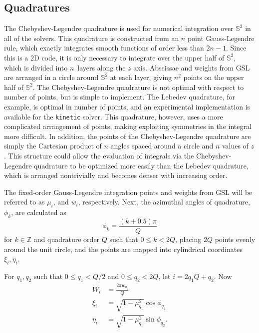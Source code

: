 \documentclass{article}
\newcommand{\Z}{\ensuremath{\mathbb{Z}}\xspace}
\newcommand{\twosphere}{\ensuremath{\mathbb{S}^2}\xspace}
\newcommand{\kinetic}{\texttt{kinetic}\xspace}
\begin{document}
\subsection{Quadratures}
\label{subsec:quadratures}
The Chebyshev-Legendre quadrature \cite{atkinson-1982} is used for numerical integration over
\twosphere in all of the solvers. This quadrature is constructed from an
$n$ point Gauss-Legendre rule, which exactly integrates smooth functions of
order less than $2n-1$. Since this is a 2D code, it is only necessary
to integrate over the upper half of \twosphere, which is divided into
$n$~layers along the $z$ axis. Abscissae and weights from GSL are arranged
in a circle around \twosphere at each layer, giving $n^2$ points on the
upper half of \twosphere. The Chebyshev-Legendre quadrature is not optimal
with respect to number of points, but is simple to implement. The Lebedev
quadrature, for example, is optimal in number of points, and an experimental
implementation is available for the \kinetic solver. This quadrature, however,
uses a more complicated arrangement of points, making exploiting symmetries
in the integral more difficult. In addition, the points of the
Chebyshev-Legendre quadrature are simply the Cartesian product of $n$ angles
spaced around a circle and $n$ values of $z$. This structure could allow the
evaluation of integrals via the Chebyshev-Legendre quadrature to be optimized
more easily than the Lebedev quadrature, which is arranged nontrivially and
becomes denser with increasing order.

The fixed-order
Gauss-Legendre integration points and weights from GSL will be referred to as $\mu_i$,
and $w_i$, respectively. Next, the
azimuthal angles of quadrature, $\phi_k$, are calculated as
\begin{equation}
    \phi_k = \frac{(k + 0.5)\pi}{Q}
\end{equation}
for $k \in \Z$ and quadrature order $Q$ such that $0 \leq k < 2Q$,
placing $2Q$ points evenly around the unit circle, and
the points are mapped into cylindrical coordinates $\xi_i,\eta_i$.

For $q_1,q_2$ such that $0 \leq q_1 < Q / 2$ and
$0 \leq q_2 < 2Q$, let
$i = 2q_1Q + q_2$. Now 
\begin{align}
    W_i &= \frac{2\pi w_{q_1}}Q \\
    \xi_i &= \sqrt{1 - \mu_{q_1}^2} \cos \phi_{q_2} \\
    \eta_i &= \sqrt{1 - \mu_{q_1}^2} \sin \phi_{q_2}.
\end{align}
\end{document}
